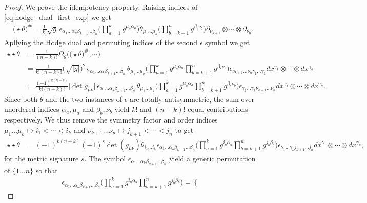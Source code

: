 \begin{proof}
We prove the idempotency property. Raising indices of \eqref{eq:hodge_dual_first_exp} we get
{\small
\begin{align}
\big(\star\theta\big)^\#= \tfrac{1}{k!}\sqrt{g}\,\epsilon_{\alpha_1\dots \alpha_k\beta_{k+1}\dots \beta_n} \Big(\prod_{a=1}^k g^{\mu_a \alpha_a}\Big) \theta_{\mu_1 \dots \mu_k} \Big(\prod_{b=k+1}^n g^{\beta_b\nu_b}\Big) \partial_{\nu_{k+1}}\otimes \cdots \otimes \partial_{\nu_n}.
\end{align}}
Apllying the Hodge dual and permuting indices of the second $\epsilon$ symbol we get 
{\small
\begin{align}
\star\star\theta &= \tfrac{1}{(n-k)!}\Omega_g\Big(\big(\star\theta\big)^\#, \cdots\Big)\\
&= \tfrac{1}{k!(n-k)!}\big(\sqrt{|g|}\big)^2\,\epsilon_{\alpha_1\dots \alpha_k\beta_{k+1}\dots \beta_n}\,\theta_{\mu_1 \dots \mu_k} \Big(\prod_{a=1}^k g^{\mu_a \alpha_a}\prod_{b=k+1}^n g^{\beta_b\nu_b}\Big) \epsilon_{\nu_{k+1}\dots \nu_n\gamma_1\dots \gamma_k} dx^{\gamma_1} \otimes \cdots \otimes dx^{\gamma_k}\\
&= \tfrac{(-1)^{k(n-k)}}{k!(n-k)!}\big|\!\det{g_{\mu\nu}}\!\big|\,\epsilon_{\alpha_1\dots \alpha_k\beta_{k+1}\dots \beta_n}\,\theta_{\mu_1 \dots \mu_k} \Big(\prod_{a=1}^k g^{\mu_a \alpha_a}\prod_{b=k+1}^n g^{\beta_b\nu_b}\Big) \epsilon_{\gamma_1\dots \gamma_k\nu_{k+1}\dots \nu_n} dx^{\gamma_1} \otimes \cdots \otimes dx^{\gamma_k}.
\end{align}}
Since both $\theta$ and the two instances of $\epsilon$ are totally antisymmetric, the sum over unordered indices $\alpha_a, \mu_a$ and $\beta_b,\nu_b$ yield $k!$ and $(n-k)!$ equal contributions respectively.
We thus remove the symmetry factor and order indices $\mu_1\dots\mu_k\mapsto i_1<\cdots < i_k$ and $\nu_{k+1}\dots \nu_n\mapsto j_{k+1}<\cdots < j_n$ to get
{\small
\begin{align}
\star\star\theta &= (-1)^{k(n-k)}(-1)^s\det(g_{\mu\nu})\theta_{i_1 \dots i_k} \epsilon_{\alpha_1\dots \alpha_k\beta_{k+1}\dots \beta_n}\Big(\prod_{a=1}^k g^{i_a \alpha_a}\prod_{b=k+1}^n g^{j_b\beta_b}\Big) \epsilon_{\gamma_1\dots \gamma_k j_{k+1}\dots j_n} dx^{\gamma_1} \otimes \cdots \otimes dx^{\gamma_k},
\end{align}}
for the metric signature $s$.
The symbol $\epsilon_{\alpha_1\dots \alpha_k\beta_{k+1}\dots \beta_n}$ yield a generic permutation of $\{1\dots n\}$ so that
{\small
\begin{align}
\epsilon_{\alpha_1\dots \alpha_k\beta_{k+1}\dots \beta_n}\Big(\prod_{a=1}^k g^{i_a \alpha_a}\prod_{b=k+1}^n g^{j_b\beta_b}\Big) = \begin{cases}

\end{cases}
\end{align}}
\end{proof}

